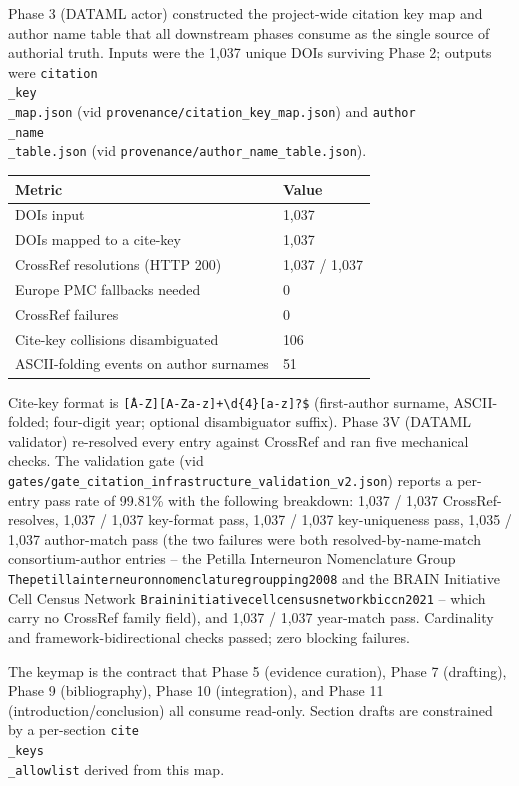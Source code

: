 \documentclass[11pt]{article}
\begin{document}
Phase 3 (DATAML actor) constructed the project-wide citation key map and author name table that all downstream phases consume as the single source of authorial truth. Inputs were the 1,037 unique DOIs surviving Phase 2; outputs were \texttt{citation\\_key\\_map.json} (vid \texttt{provenance/citation\_key\_map.json}) and \texttt{author\\_name\\_table.json} (vid \texttt{provenance/author\_name\_table.json}).

\bigskip\noindent
\begin{tabular}{p{}p{}}
\toprule
Metric & Value \\
\hline
DOIs input & 1,037 \\
DOIs mapped to a cite-key & 1,037 \\
CrossRef resolutions (HTTP 200) & 1,037 / 1,037 \\
Europe PMC fallbacks needed & 0 \\
CrossRef failures & 0 \\
Cite-key collisions disambiguated & 106 \\
ASCII-folding events on author surnames & 51 \\
\bottomrule
\end{tabular}

\bigskip

Cite-key format is \texttt{\^[A-Z][A-Za-z]+{\textbackslash}d\{4\}[a-z]?\$} (first-author surname, ASCII-folded; four-digit year; optional disambiguator suffix). Phase 3V (DATAML validator) re-resolved every entry against CrossRef and ran five mechanical checks. The validation gate (vid \texttt{gates/gate\_citation\_infrastructure\_validation\_v2.json}) reports a per-entry pass rate of 99.81\% with the following breakdown: 1,037 / 1,037 CrossRef-resolves, 1,037 / 1,037 key-format pass, 1,037 / 1,037 key-uniqueness pass, 1,035 / 1,037 author-match pass (the two failures were both resolved-by-name-match consortium-author entries -- the Petilla Interneuron Nomenclature Group \texttt{Thepetillainterneuronnomenclaturegroupping2008} and the BRAIN Initiative Cell Census Network \texttt{Braininitiativecellcensusnetworkbiccn2021} -- which carry no CrossRef family field), and 1,037 / 1,037 year-match pass. Cardinality and framework-bidirectional checks passed; zero blocking failures.

The keymap is the contract that Phase 5 (evidence curation), Phase 7 (drafting), Phase 9 (bibliography), Phase 10 (integration), and Phase 11 (introduction/conclusion) all consume read-only. Section drafts are constrained by a per-section \texttt{cite\\_keys\\_allowlist} derived from this map.
\end{document}

